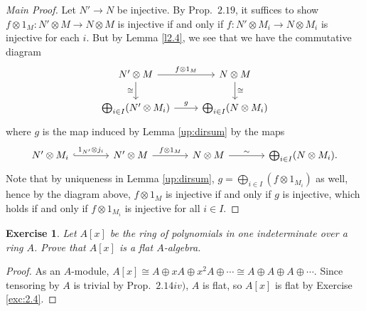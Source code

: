 \documentclass[12pt,letterpaper]{article}
\newtheorem{problem}{Exercise}[section]
\theoremstyle{definition}
\theoremstyle{remark}
\numberwithin{figure}{problem}
\numberwithin{equation}{section}
\begin{document}
\begin{proof}[Main Proof]
  Let $N' \to N$ be injective. By Prop.~$2.19$, it suffices to show $f \otimes 1_M\colon N' \otimes M \to N \otimes M$ is injective if and only if $f\colon N' \otimes M_i \to N \otimes M_i$ is injective for each $i$. But by Lemma \ref{l2.4}, we see that we have the commutative diagram
  \begin{equation*}
    \begin{tikzcd}
      N' \otimes M \rar{f \otimes 1_M} & N \otimes M \arrow{d}{\cong}\\
      \bigoplus_{i \in I}(N' \otimes M_i) \arrow{r}{g} \arrow[leftarrow]{u}{\cong} & \bigoplus_{i \in I}(N \otimes M_i)
    \end{tikzcd}
  \end{equation*}
  where $g$ is the map induced by Lemma \ref{up:dirsum} by the maps
  \begin{equation*}
    \begin{tikzcd}[column sep=large]
      N' \otimes M_i \rar[hook]{1_{N'} \otimes j_i} & N' \otimes M \rar{f \otimes 1_M} & N \otimes M \rar{\sim} & \bigoplus_{i \in I}(N \otimes M_i).
    \end{tikzcd}
  \end{equation*}
  Note that by uniqueness in Lemma \ref{up:dirsum}, $g = \bigoplus_{i \in I} (f \otimes 1_{M_i})$ as well, hence by the diagram above, $f \otimes 1_M$ is injective if and only if $g$ is injective, which holds if and only if $f \otimes 1_{M_i}$ is injective for all $i \in I$.
\end{proof}

\begin{problem}\label{exc:2.5}
  Let $A[x]$ be the ring of polynomials in one indeterminate over a ring $A$. Prove that $A[x]$ is a flat $A$-algebra.
\end{problem}
\begin{proof}
  As an $A$-module, $A[x] \cong A \oplus xA \oplus x^2A \oplus \cdots \cong A \oplus A \oplus A \oplus \cdots$. Since tensoring by $A$ is trivial by Prop.~$2.14iv)$, $A$ is flat, so $A[x]$ is flat by Exercise \ref{exc:2.4}.
\end{proof}
\end{document}
